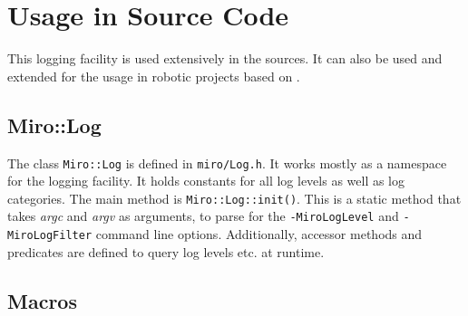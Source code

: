 \section{Usage in Source Code}

This logging facility is used extensively in the \miro sources. It can
also be used and extended for the usage in robotic projects based on
\miro.

\subsection{Miro::Log}

The class \texttt{Miro::Log} is defined in \texttt{miro/Log.h}. It
works mostly as a namespace for the logging facility. It holds
constants for all log levels as well as log categories. The main
method is \texttt{Miro::Log::init()}. This is a static method that
takes \textit{argc} and \textit{argv} as arguments, to parse for the
\texttt{-MiroLogLevel} and \texttt{-MiroLogFilter} command line
options. Additionally, accessor methods and predicates are defined to
query log levels etc.  at runtime.

\subsection{Macros}

